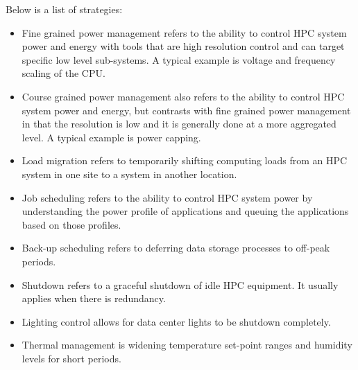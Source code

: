 Below is a list of strategies:

\begin{itemize}
\item Fine grained power management refers to the ability to control HPC system power 
and energy with tools that are high resolution control and can target specific 
low level sub-systems. A typical example is voltage and frequency scaling of the CPU.

\item Course grained power management also refers to the ability to control HPC 
system power and energy, but contrasts with fine grained power management in 
that the resolution is low and it is generally done at a more aggregated level. 
A typical example is power capping.

\item Load migration refers to temporarily shifting computing loads from 
an HPC system in one site to a system in another location.

\item Job scheduling refers to the ability to control HPC system power 
by understanding the power profile of applications and queuing the 
applications based on those profiles.

\item Back-up scheduling refers to deferring data storage processes to off-peak periods.

\item Shutdown refers to a graceful shutdown of idle HPC equipment. It usually 
applies when there is redundancy.

\item Lighting control allows for data center lights to be shutdown completely.

\item Thermal management is widening temperature set-point ranges and 
humidity levels for short periods.
\end{itemize}


